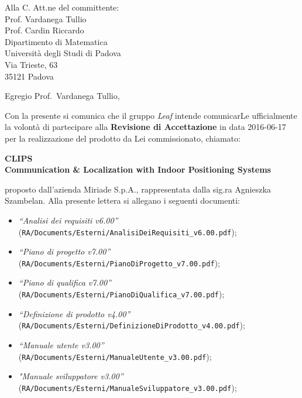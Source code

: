\documentclass[a4paper,12pt]{letteracdp}
\author{Andrea Tombolato}
\date{??? Giugno 2016}
\begin{document}
	\begin{letter}{
		Alla C. Att.ne del committente: \\
		Prof. Vardanega Tullio \\
		Prof. Cardin Riccardo \\
		Dipartimento di Matematica \\
		Università degli Studi di Padova \\
		Via Trieste, 63 \\
		35121 Padova}
		
		\opening{Egregio Prof.~Vardanega Tullio,}
		Con la presente si comunica che il gruppo \textit{Leaf} intende comunicarLe ufficialmente la volontà di partecipare alla \textbf{Revisione di Accettazione} in data 2016-06-17 per la realizzazione del prodotto da Lei commissionato, chiamato:
\begin{center}
	\textbf{CLIPS \\ Communication \& Localization with Indoor Positioning Systems}
\end{center}
proposto dall'azienda Miriade S.p.A., rappresentata dalla sig.ra Agnieszka Szambelan.
Alla presente lettera si allegano i seguenti documenti:
%
\begin{itemize}
	\item \textit{“Analisi dei requisiti v6.00”} \\(\texttt{RA/Documents/Esterni/AnalisiDeiRequisiti\_v6.00.pdf});

	\item \textit{“Piano di progetto v7.00”} \\(\texttt{RA/Documents/Esterni/PianoDiProgetto\_v7.00.pdf});

	\item \textit{“Piano di qualifica v7.00”} \\(\texttt{RA/Documents/Esterni/PianoDiQualifica\_v7.00.pdf});
	
	\item \textit{“Definizione di prodotto v4.00”} \\(\texttt{RA/Documents/Esterni/DefinizioneDiProdotto\_v4.00.pdf});
	
	\item \textit{“Manuale utente v3.00”} \\(\texttt{RA/Documents/Esterni/ManualeUtente\_v3.00.pdf});
	
	\item \textit{"Manuale sviluppatore v3.00”} \\(\texttt{RA/Documents/Esterni/ManualeSviluppatore\_v3.00.pdf});
	

\end{itemize}
\end{letter}
\end{document}
